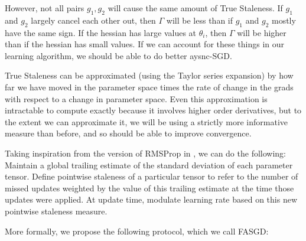 \documentclass{article} %
\begin{document}
However, not all pairs $g_1, g_2$ will cause the same amount of True Staleness.
If $g_1$ and $g_2$ largely cancel each other out, then $\Gamma$ will be less than if $g_1$ and $g_2$ mostly have the same sign.
If the hessian has large values at $\theta_i$, then $\Gamma$ will be higher than if the hessian has small values.
If we can account for these things in our learning algorithm, we should be able to do better aysnc-SGD.

True Staleness can be approximated (using the Taylor series expansion)
by how far we have moved in the parameter space times the rate of change
in the grads with respect to a change in parameter space.
Even this approximation is intractable to compute exactly because it involves higher order derivatives,
but to the extent we can approximate it,
we will be using a strictly more informative measure than before, and so should be able to improve convergence.

Taking inspiration from the version of RMSProp in \cite{Graves}, we can do the following:
Maintain a global trailing estimate of the standard deviation of each parameter tensor.
Define pointwise staleness of a particular tensor to refer to the number of missed updates weighted by the value of this
trailing estimate at the time those updates were applied.
At update time, modulate learning rate based on this new pointwise staleness measure.

More formally, we propose the following protocol, which we call FASGD:
\end{document}
